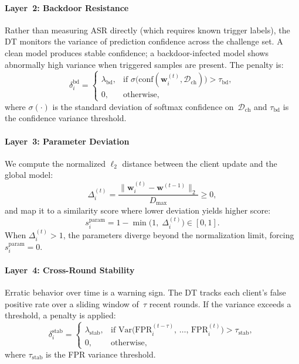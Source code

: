 \paragraph{Layer~2: Backdoor Resistance} Rather than measuring ASR directly (which requires known trigger labels), the DT monitors the variance of prediction confidence across the challenge set. A clean model produces stable confidence; a backdoor-infected model shows abnormally high variance when triggered samples are present. The penalty is:
\begin{equation}
    \delta_i^{\text{bd}} =
    \begin{cases}
        \lambda_{\text{bd}}, & \text{if } \sigma\bigl(\text{conf}(\mathbf{w}_i^{(t)}, \mathcal{D}_{\text{ch}})\bigr) > \tau_{\text{bd}}, \\
        0, & \text{otherwise},
    \end{cases}
\label{eq:bd}
\end{equation}
where $\sigma(\cdot)$ is the standard deviation of softmax confidence on~$\mathcal{D}_{\text{ch}}$ and $\tau_{\text{bd}}$ is the confidence variance threshold.

\paragraph{Layer~3: Parameter Deviation} We compute the normalized $\ell_2$ distance between the client update and the global model:
\begin{equation}
    \Delta_i^{(t)} = \frac{\|\mathbf{w}_i^{(t)} - \mathbf{w}^{(t-1)}\|_2}{D_{\max}} \ge 0,
\label{eq:param-dist}
\end{equation}
and map it to a similarity score where lower deviation yields higher score:
\begin{equation}
    s_i^{\text{param}} = 1 - \min\bigl(1,\; \Delta_i^{(t)}\bigr) \in [0,1].
\label{eq:param}
\end{equation}
When $\Delta_i^{(t)} > 1$, the parameters diverge beyond the normalization limit, forcing $s_i^{\text{param}} = 0$.

\paragraph{Layer~4: Cross-Round Stability} Erratic behavior over time is a warning sign. The DT tracks each client's false positive rate over a sliding window of~$\tau$ recent rounds. If the variance exceeds a threshold, a penalty is applied:
\begin{equation}
    \delta_i^{\text{stab}} =
    \begin{cases}
        \lambda_{\text{stab}}, & \text{if } \mathrm{Var}\!\bigl(\text{FPR}_i^{(t{-}\tau)},\, \dots,\, \text{FPR}_i^{(t)}\bigr) > \tau_{\text{stab}}, \\
        0, & \text{otherwise},
    \end{cases}
\label{eq:stab}
\end{equation}
where $\tau_{\text{stab}}$ is the FPR variance threshold.

